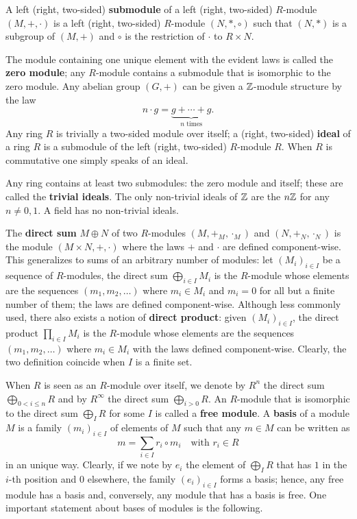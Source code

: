 A left
(right,
two-sided) \textbf{submodule} of a left
(right, two-sided) $R$-module $(M,+,\cdot)$ is a left (right, two-sided)
$R$-module $(N,\ast,\circ)$ such that $(N,\ast)$ is a subgroup of
$(M,+)$ and $\circ$ is the restriction of $\cdot$ to $R\times N$.

The module containing one unique element with the evident laws is
called the \textbf{zero module}; any
$R$-module contains a submodule that is isomorphic to the zero module.
Any abelian group $(G,+)$ can be given a $\mathbb{Z}$-module structure by the
law
\[n\cdot g = \underbrace{g + \cdots + g}_{n\text{ times}} \text{.}\]
Any ring $R$ is trivially a two-sided module over itself; a
 (right,
two-sided) \textbf{ideal} of a ring $R$ is a
submodule of the left (right, two-sided) $R$-module $R$.  When $R$ is
commutative one simply speaks of an ideal.  

Any ring contains at least two submodules: the zero module and itself;
these are called the \textbf{trivial ideals}. The
only non-trivial ideals of $\mathbb{Z}$ are the $n\mathbb{Z}$ for any $n\ne0,1$. A
field has no non-trivial ideals.

The \textbf{direct sum} $M\oplus N$ of two
$R$-modules $(M,+_M,\cdot_M)$ and $(N,+_N,\cdot_N)$ is the module
$(M\times N,+,\cdot)$ where the laws $+$ and $\cdot$ are defined
component-wise. This generalizes to sums of an arbitrary number of
modules: let $(M_i)_{i\in I}$ be a sequence of $R$-modules, the direct
sum $\bigoplus_{i\in I}M_i$ is the $R$-module whose elements are the
sequences $(m_1,m_2,\ldots)$ where $m_i\in M_i$ and $m_i=0$ for all
but a finite number of them; the laws are defined component-wise.
Although less commonly used, there also exists a notion of
\textbf{direct product}: given $(M_i)_{i\in I}$,
the direct product $\prod_{i\in I}M_i$ is the $R$-module whose
elements are the sequences $(m_1,m_2,\ldots)$ where $m_i\in M_i$ with
the laws defined component-wise. Clearly, the two definition coincide
when $I$ is a finite set.

When $R$ is seen as an $R$-module over itself, we denote by $R^n$ the
direct sum $\bigoplus_{0<i\le n}R$ and by $R^\infty$ the direct sum
$\bigoplus_{i>0}R$. An $R$-module that is isomorphic to the direct sum
$\bigoplus_{I}R$ for some $I$ is called a
\textbf{free module}. A \textbf{basis}
of a module $M$ is a family $(m_i)_{i\in I}$ of elements of $M$ such
that any $m\in M$ can be written as 
\begin{equation}
  \label{eq:module-basis}
  m = \sum_{i\in I} r_i\circ m_i
  \quad\text{with $r_i\in R$}
\end{equation}
in an unique way. Clearly, if we note by $e_i$ the element of
$\bigoplus_IR$ that has $1$ in the $i$-th position and $0$ elsewhere,
the family $(e_i)_{i\in I}$ forms a basis; hence, any free module has
a basis and, conversely, any module that has a basis is free. One
important statement about bases of modules is the following.

